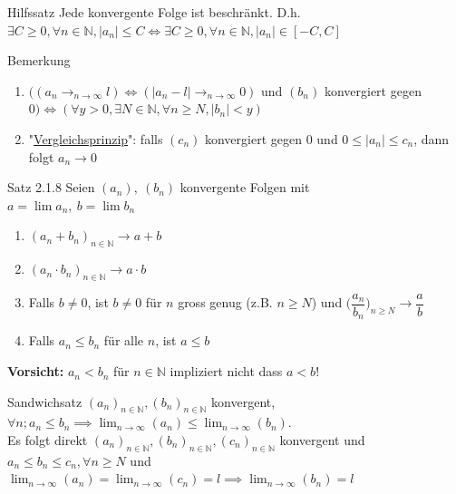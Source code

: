 \documentclass[a4paper,10pt]{article}
\begin{document}
\begin{tbox} {Hilfssatz}
Jede konvergente Folge ist beschränkt. D.h. $\exists C \ge 0, \forall n \in \mathbb{N}, |a_n|\le C\iff \exists C \ge 0, \forall n \in \mathbb{N}, |a_n|\in [-C,C]$
\end{tbox}
\begin{bembox}{Bemerkung}
    \begin{enumerate}
        \item $\big((a_n\longrightarrow_{n\to\infty} l) \iff (|a_n-l|\longrightarrow_{n\to\infty} 0)$ und $(b_n)$ konvergiert gegen $0\big)\iff (\forall y > 0, \exists N \in \mathbb{N}, \forall n\ge N, |b_n|<y)$
        \item "\underline{Vergleichsprinzip}": falls $(c_n)$ konvergiert gegen $0$ und $0\le |a_n| \le c_n$, dann folgt $a_n\longrightarrow 0$
    \end{enumerate}
\end{bembox}
\begin{tbox}{Satz 2.1.8}
    Seien $(a_n), \ (b_n) $ konvergente Folgen mit \\$a=\lim a_n, \ b= \lim b_n$
     \begin{enumerate}
         \item $(a_n+b_n)_{n\in\mathbb{N}} \longrightarrow a+b$ 
         \item $(a_n\cdot b_n)_{n\in \mathbb N} \longrightarrow a\cdot b$ 
         \item Falls $b\neq 0$, ist $b\neq 0$ für $n$ gross genug (z.B. $n\ge N$) und $\bigg(\dfrac {a_n} {b_n}\bigg)_{n\ge N}\longrightarrow \dfrac a b $
         \item Falls $a_n\le b_n$ für alle $n$, ist $a\le b$
     \end{enumerate}
\end{tbox}
\begin{flushleft}
\textbf{Vorsicht: } $a_n<b_n$ für $n\in \mathbb N$ impliziert nicht dass $a<b$!
\end{flushleft}

\begin{tbox}{Sandwichsatz}
$(a_n)_{n\in\mathbb N}, (b_n)_{n\in\mathbb N}$ konvergent, $\forall n; a_n\le b_n \implies \lim_{n\to\infty} (a_n)\le \lim_{n\to\infty}(b_n)$. \\Es folgt direkt $(a_n)_{n\in\mathbb{N}},(b_n)_{n\in\mathbb{N}}, (c_n)_{n\in\mathbb{N}}$ konvergent und $a_n\le b_n \le c_n, \forall n \ge N$ und $\lim_{n\to\infty}(a_n)=\lim_{n\to\infty}(c_n)=l\implies \lim_{n\to\infty}(b_n)=l$
    
\end{tbox}
\end{document}
